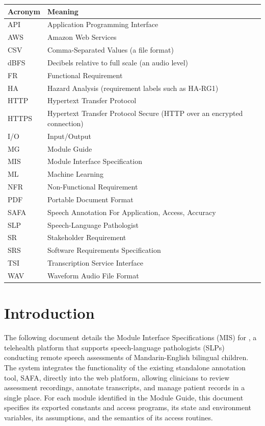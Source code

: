 \documentclass[12pt, titlepage]{article}
\begin{document}
\begin{tabular}{l l}
\toprule
\textbf{Acronym} & \textbf{Meaning}\\
\midrule
API & Application Programming Interface\\
AWS & Amazon Web Services\\
CSV & Comma-Separated Values (a file format)\\
dBFS & Decibels relative to full scale (an audio level)\\
FR & Functional Requirement\\
HA & Hazard Analysis (requirement labels such as HA-RG1)\\
HTTP & Hypertext Transfer Protocol\\
HTTPS & Hypertext Transfer Protocol Secure (HTTP over an encrypted connection)\\
I/O & Input/Output\\
MG & Module Guide\\
MIS & Module Interface Specification\\
ML & Machine Learning\\
NFR & Non-Functional Requirement \\
PDF & Portable Document Format\\
SAFA & Speech Annotation For Application, Access, Accuracy\\
SLP & Speech-Language Pathologist\\
SR & Stakeholder Requirement \\
SRS & Software Requirements Specification\\
TSI & Transcription Service Interface\\
WAV & Waveform Audio File Format\\
\bottomrule
\end{tabular}

\newpage

\tableofcontents

\newpage


\section{Introduction}

The following document details the Module Interface Specifications (MIS) for
\progname{}, a telehealth platform that supports speech-language pathologists
(SLPs) conducting remote speech assessments of Mandarin-English bilingual
children. The system integrates the functionality of the existing standalone
annotation tool, SAFA, directly into the \progname{} web platform, allowing
clinicians to review assessment recordings, annotate transcripts, and manage patient records in a single place. 
For each module identified in the Module Guide, this document specifies its
exported constants and access programs, its state and environment variables,
its assumptions, and the semantics of its access routines.
\end{document}
